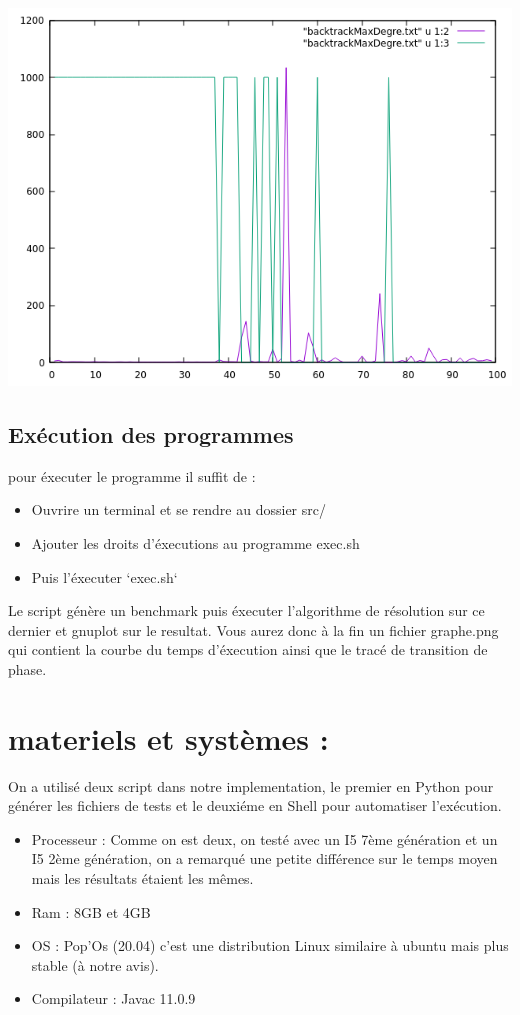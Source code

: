 \documentclass[oneside,13pt,a4paper]{article}
\begin{document}
\includegraphics{img/backtrackMaxDegre.png}

\subsection{Exécution des programmes}
pour éxecuter le programme il suffit de :
\begin{itemize}	
	\item Ouvrire un terminal et se rendre au dossier src/
	\item Ajouter les droits d'éxecutions au programme exec.sh
	\item Puis l'éxecuter `exec.sh`
\end{itemize}

Le script génère un benchmark puis éxecuter l'algorithme de résolution sur ce dernier et gnuplot sur le resultat. Vous aurez donc à la fin un fichier graphe.png qui contient la courbe du temps d'éxecution ainsi que le tracé de transition de phase.

\section{materiels et systèmes : }
On a utilisé deux script dans notre implementation, le premier en Python pour générer les fichiers de tests et le deuxiéme en Shell pour automatiser l'exécution.
\begin{itemize}
	\item Processeur : Comme on est deux, on testé avec un I5 7ème génération et un I5 2ème génération, on a remarqué une petite différence sur le temps moyen mais les résultats étaient les mêmes.
	\item Ram : 8GB et 4GB
	\item OS : Pop'Os (20.04) c'est une distribution Linux similaire à ubuntu mais plus stable (à notre avis).
	\item Compilateur : Javac 11.0.9
\end{itemize}
\end{document}
